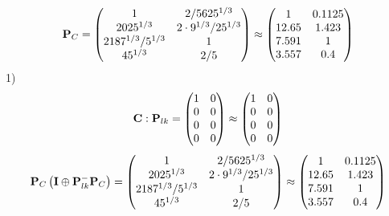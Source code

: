 \documentclass[10pt,a4paper]{article}
\begin{document}
	\[
		\bold{P}_{C} = 
		\begin{pmatrix}
			{1}{} & {{2}} / {{5625^ {1 / 3}}} \\
			{{2025^ {1 / 3}}}{} & {{2} \cdot {9^ {1 / 3}}} / {{25^ {1 / 3}}} \\
			{{2187^ {1 / 3}}} / {{5^ {1 / 3}}} & {1}{} \\
			{{45^ {1 / 3}}}{} & {{2}} / {{5}} \\
		\end{pmatrix}
		\approx
		\begin{pmatrix}
			1        & 0.1125   \\
			12.65    & 1.423    \\
			7.591    & 1        \\
			3.557    & 0.4      \\
		\end{pmatrix}
	\]
	1)
	\[
		\bold{C}: \bold{P}_{lk} = 
		\begin{pmatrix}
			{1}{} & {{0}}{} \\
			{{0}}{} & {{0}}{} \\
			{{0}}{} & {{0}}{} \\
			{{0}}{} & {{0}}{} \\
		\end{pmatrix}
		\approx
		\begin{pmatrix}
			1        & 0        \\
			0        & 0        \\
			0        & 0        \\
			0        & 0        \\
		\end{pmatrix}
	\]
	\[
		\bold{P}_{C}\left(\bold{I} \oplus \bold{P}_{lk}^{-}\bold{P}_{C}\right) = 
		\begin{pmatrix}
			{1}{} & {{2}} / {{5625^ {1 / 3}}} \\
			{{2025^ {1 / 3}}}{} & {{2} \cdot {9^ {1 / 3}}} / {{25^ {1 / 3}}} \\
			{{2187^ {1 / 3}}} / {{5^ {1 / 3}}} & {1}{} \\
			{{45^ {1 / 3}}}{} & {{2}} / {{5}} \\
		\end{pmatrix}
		\approx
		\begin{pmatrix}
			1        & 0.1125   \\
			12.65    & 1.423    \\
			7.591    & 1        \\
			3.557    & 0.4      \\
		\end{pmatrix}
	\]
\end{document}
